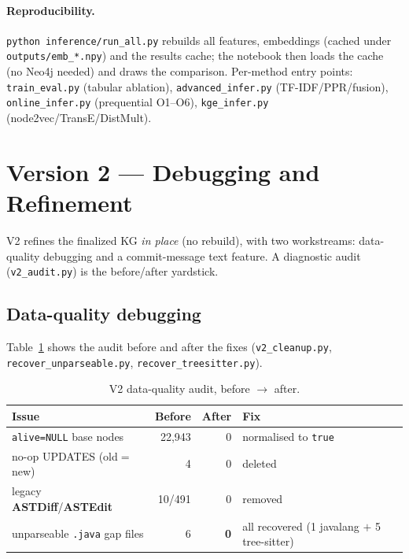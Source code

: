 \documentclass[11pt,a4paper]{article}
\newcommand{\code}[1]{\texttt{#1}}
\newcommand{\node}[1]{\textcolor{kgblue}{\textbf{#1}}}
\newcommand{\edge}[1]{\textsc{#1}}
\begin{document}
	\paragraph{Reproducibility.} \texttt{python inference/run\_all.py} rebuilds all
	features, embeddings (cached under \texttt{outputs/emb\_*.npy}) and the results
	cache; the notebook then loads the cache (no Neo4j needed) and draws the
	comparison. Per-method entry points: \texttt{train\_eval.py} (tabular ablation),
	\texttt{advanced\_infer.py} (TF-IDF/PPR/fusion), \texttt{online\_infer.py}
	(prequential O1--O6), \texttt{kge\_infer.py} (node2vec/TransE/DistMult).
	
	\section{Version 2 --- Debugging and Refinement}\label{sec:v2}
	V2 refines the finalized KG \emph{in place} (no rebuild), with two workstreams:
	data-quality debugging and a commit-message text feature. A diagnostic audit
	(\texttt{v2\_audit.py}) is the before/after yardstick.
	
	\subsection{Data-quality debugging}
	Table~\ref{tab:v2audit} shows the audit before and after the fixes
	(\texttt{v2\_cleanup.py}, \texttt{recover\_unparseable.py},
	\texttt{recover\_treesitter.py}).
	
	\begin{table}[H]\centering\small
		\caption{V2 data-quality audit, before $\rightarrow$ after.}\label{tab:v2audit}
		\begin{tabular}{@{}lrrl@{}}
			\toprule
			\textbf{Issue} & \textbf{Before} & \textbf{After} & \textbf{Fix}\\
			\midrule
			\code{alive=NULL} base nodes        & 22{,}943 & 0 & normalised to \code{true}\\
			no-op \edge{UPDATES} (old$=$new)    & 4        & 0 & deleted\\
			legacy \node{ASTDiff}/\node{ASTEdit}& 10/491   & 0 & removed\\
			unparseable \texttt{.java} gap files& 6        & \textbf{0} & all recovered (1 javalang $+$ 5 tree-sitter)\\
			\bottomrule
		\end{tabular}
	\end{table}
	
\end{document}
